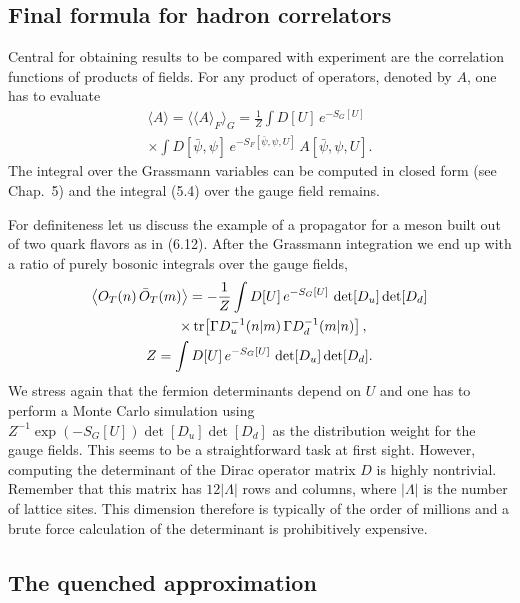 \subsection{Final formula for hadron correlators}

Central for obtaining results to be compared with experiment are the
correlation functions of products of fields. For any product of operators,
denoted by $A$, one has to evaluate
\begin{multline}
  \langle A\rangle = \big\langle \langle A\rangle_F \big\rangle_G
  = \frac{1}{Z}\int D[U]\, e^{-S_G[U]} \\
  \times \int D[\bar\psi,\psi]\, e^{-S_F[\bar\psi,\psi,U]}\,
    A[\bar\psi,\psi,U] .
\end{multline}
The integral over the Grassmann variables can be computed in closed form (see
Chap.~5) and the integral (5.4) over the gauge field remains.

For definiteness let us discuss the example of a propagator for a meson built
out of two quark flavors as in (6.12). After the Grassmann integration we end
up with a ratio of purely bosonic integrals over the gauge fields,
\begin{equation}
  \begin{gathered}
    \big\langle O_T(n)\, \bar{O}_T(m) \big\rangle
    = -\frac{1}{Z}\int D[U]\, e^{-S_G[U]}\, \det[D_u]\det[D_d] \\
    \qquad \times \operatorname{tr}\!\left[ \Gamma D_u^{-1}(n|m)\, \Gamma D_d^{-1}(m|n) \right], \\
    Z = \int D[U]\, e^{-S_G[U]}\, \det[D_u]\det[D_d] .
  \end{gathered}
\end{equation}
We stress again that the fermion determinants depend on $U$ and one has to
perform a Monte Carlo simulation using $Z^{-1}\exp(-S_G[U])\det[D_u]\det[D_d]$
as the distribution weight for the gauge fields. This seems to be a
straightforward task at first sight. However, computing the determinant of the
Dirac operator matrix $D$ is highly nontrivial. Remember that this matrix has
$12|\Lambda|$ rows and columns, where $|\Lambda|$ is the number of lattice
sites. This dimension therefore is typically of the order of millions and a
brute force calculation of the determinant is prohibitively expensive.

\subsection{The quenched approximation}

